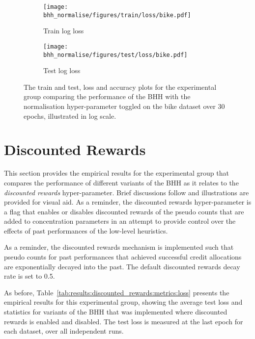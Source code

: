 \begin{figure}[htbp]
      \begin{subfigure}{0.5\textwidth}
            \centering
            \texttt{[image: bhh\_normalise/figures/train/loss/bike.pdf]}
            \caption{Train log loss}
            \label{fig:results:normalise:figures:loss:train:bike}
      \end{subfigure}
      \begin{subfigure}{0.5\textwidth}
            \centering
            \texttt{[image: bhh\_normalise/figures/test/loss/bike.pdf]}
            \caption{Test log loss}
            \label{fig:results:normalise:figures:loss:test:bike}
      \end{subfigure}
      \par\bigskip
      \caption{The train and test, loss and accuracy plots for the experimental group comparing the performance of the \acs{BHH} with the normalisation hyper-parameter toggled on the bike dataset over 30 epochs, illustrated in log scale.}
      \label{fig:results:normalise:figures:bike}
\end{figure}


\section{Discounted Rewards}\label{sec:results:discounted_rewards}

This section provides the empirical results for the experimental group that compares the performance of different variants of the \acs{BHH} as it relates to the \textit{discounted rewards} hyper-parameter. Brief discussions follow and illustrations are provided for visual aid. As a reminder, the discounted rewards hyper-parameter is a flag that enables or disables discounted rewards of the pseudo counts that are added to concentration parameters in an attempt to provide control over the effects of past performances of the low-level heuristics.

As a reminder, the discounted rewards mechanism is implemented such that pseudo counts for past performances that achieved successful credit allocations are exponentially decayed into the past. The default discounted rewards decay rate is set to 0.5.

As before, Table~\ref{tab:results:discounted_rewards:metrics:loss} presents the empirical results for this experimental group, showing the average test loss and statistics for variants of the \acs{BHH} that was implemented where discounted rewards is enabled and disabled. The test loss is measured at the last epoch for each dataset, over all independent runs.

